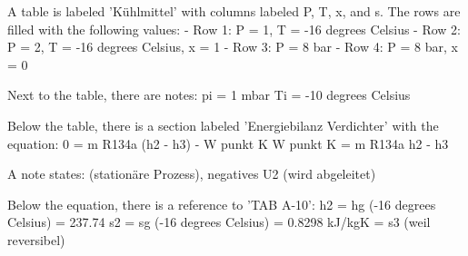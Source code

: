 A table is labeled 'Kühlmittel' with columns labeled P, T, x, and s. The rows are filled with the following values:
- Row 1: P = 1, T = -16 degrees Celsius
- Row 2: P = 2, T = -16 degrees Celsius, x = 1
- Row 3: P = 8 bar
- Row 4: P = 8 bar, x = 0

Next to the table, there are notes: 
pi = 1 mbar
Ti = -10 degrees Celsius

Below the table, there is a section labeled 'Energiebilanz Verdichter' with the equation:
0 = m R134a (h2 - h3) - W punkt K
W punkt K = m R134a
h2 - h3

A note states: (stationäre Prozess), negatives U2 (wird abgeleitet)

Below the equation, there is a reference to 'TAB A-10':
h2 = hg (-16 degrees Celsius) = 237.74
s2 = sg (-16 degrees Celsius) = 0.8298 kJ/kgK
= s3 (weil reversibel)